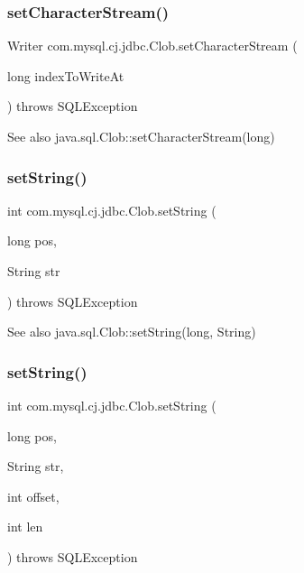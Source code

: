 \subsubsection{\texorpdfstring{set\+Character\+Stream()}{setCharacterStream()}}
{\footnotesize\ttfamily Writer com.\+mysql.\+cj.\+jdbc.\+Clob.\+set\+Character\+Stream (\begin{DoxyParamCaption}\item[{long}]{index\+To\+Write\+At }\end{DoxyParamCaption}) throws S\+Q\+L\+Exception}

\begin{DoxySeeAlso}{See also}
java.\+sql.\+Clob\+::set\+Character\+Stream(long) 
\end{DoxySeeAlso}
\mbox{\label{classcom_1_1mysql_1_1cj_1_1jdbc_1_1_clob_a16363c80864ce2bcbee073698856df78}} 
\subsubsection{\texorpdfstring{set\+String()}{setString()}\hspace{0.1cm}{\footnotesize\ttfamily [1/2]}}
{\footnotesize\ttfamily int com.\+mysql.\+cj.\+jdbc.\+Clob.\+set\+String (\begin{DoxyParamCaption}\item[{long}]{pos,  }\item[{String}]{str }\end{DoxyParamCaption}) throws S\+Q\+L\+Exception}

\begin{DoxySeeAlso}{See also}
java.\+sql.\+Clob\+::set\+String(long, String) 
\end{DoxySeeAlso}
\mbox{\label{classcom_1_1mysql_1_1cj_1_1jdbc_1_1_clob_ad219cc0c1ae1ab62a8819a31382d6276}} 
\subsubsection{\texorpdfstring{set\+String()}{setString()}\hspace{0.1cm}{\footnotesize\ttfamily [2/2]}}
{\footnotesize\ttfamily int com.\+mysql.\+cj.\+jdbc.\+Clob.\+set\+String (\begin{DoxyParamCaption}\item[{long}]{pos,  }\item[{String}]{str,  }\item[{int}]{offset,  }\item[{int}]{len }\end{DoxyParamCaption}) throws S\+Q\+L\+Exception}

